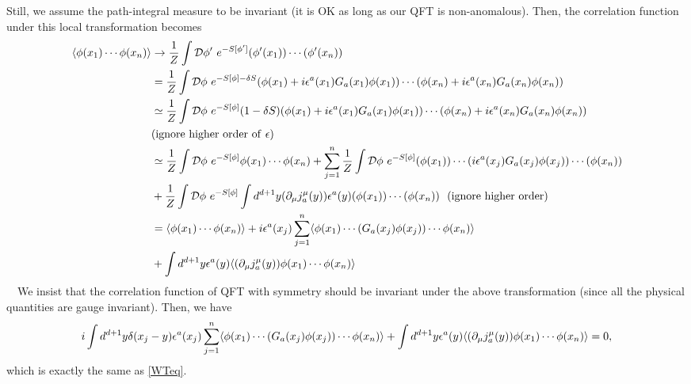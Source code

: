 \documentclass{ltjsarticle}
\theoremstyle{mystyle} %
\numberwithin{equation}{section}
\begin{document}
Still, we assume the path-integral measure to be invariant (it is OK as long as our QFT is non-anomalous). 
Then, the correlation function under this local transformation becomes
\begin{align}
    \langle{\phi(x_1)\cdots \phi(x_n)}\rangle
    &\to \frac{1}{Z}\int \mathcal{D}{\phi'}~ e^{-S[\phi']}(\phi'(x_1))\cdots (\phi'(x_n))\\
    &=\frac{1}{Z}\int \mathcal{D}{\phi}~ e^{-S[\phi]- \delta S}(\phi(x_1) + i\epsilon^a(x_1) G_a(x_1)\phi(x_1))\cdots (\phi(x_n) + i\epsilon^a(x_n) G_a(x_n)\phi(x_n))\\
    &\simeq \frac{1}{Z}\int \mathcal{D}{\phi}~ e^{-S[\phi]}(1-\delta S)(\phi(x_1) + i\epsilon^a(x_1) G_a(x_1)\phi(x_1))\cdots (\phi(x_n) + i\epsilon^a(x_n) G_a(x_n)\phi(x_n))\\
    &(\mathrm{ignore~higher~order~of~}\epsilon)\\
    &\simeq \frac{1}{Z}\int \mathcal{D}{\phi}~ e^{-S[\phi]}\phi(x_1)\cdots \phi(x_n)
    +\sum_{j=1}^{n}\frac{1}{Z}\int \mathcal{D}{\phi}~ e^{-S[\phi]}(\phi(x_1))\cdots (i\epsilon^a(x_j) G_a(x_j)\phi(x_j))\cdots (\phi(x_n))\\
    &+\frac{1}{Z}\int \mathcal{D}{\phi}~ e^{-S[\phi]} \int d^{d+1}y (\partial_\mu j^\mu_a(y)) \epsilon^a(y) (\phi(x_1))\cdots (\phi(x_n))~~(\mathrm{ignore~higher~order})\\
    &=\langle{\phi(x_1)\cdots \phi(x_n)}\rangle
    +i\epsilon^a(x_j) \sum_{j=1}^{n}\langle{\phi(x_1)\cdots (G_a(x_j)\phi(x_j))\cdots \phi(x_n)}\rangle\\
    &+\int d^{d+1}y \epsilon^a(y)\langle{(\partial_\mu j^\mu_a(y))  \phi(x_1)\cdots \phi(x_n)}\rangle\\
\end{align}
　We insist that the correlation function of QFT with symmetry should be invariant under the above transformation
(since all the physical quantities are gauge invariant). 
Then, we have
\begin{align}
    i\int d^{d+1}y \delta(x_j-y)\epsilon^a(x_j) \sum_{j=1}^{n}\langle{\phi(x_1)\cdots (G_a(x_j)\phi(x_j))\cdots \phi(x_n)}\rangle
    +\int d^{d+1}y \epsilon^a(y)\langle{(\partial_\mu j^\mu_a(y))  \phi(x_1)\cdots \phi(x_n)}\rangle=0, 
\end{align}
which is exactly the same as \eqref{WTeq}. 
\end{document}
